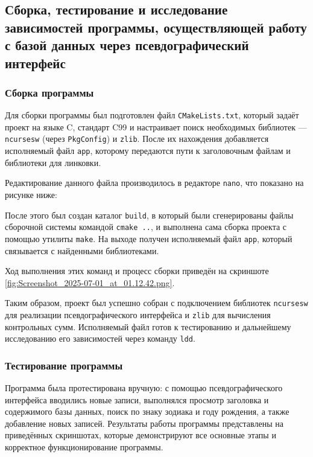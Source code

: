 \subsection{Сборка, тестирование и исследование зависимостей программы, осуществляющей работу с базой данных через псевдографический интерфейс}

\subsubsection{Сборка программы}

Для сборки программы был подготовлен файл \texttt{CMakeLists.txt}, который задаёт проект на языке C, стандарт C99 и настраивает поиск необходимых библиотек --- \texttt{ncursesw} (через \texttt{PkgConfig}) и \texttt{zlib}. После их нахождения добавляется исполняемый файл \texttt{app}, которому передаются пути к заголовочным файлам и библиотеки для линковки.

Редактирование данного файла производилось в редакторе \texttt{nano}, что показано на рисунке ниже:


После этого был создан каталог \texttt{build}, в который были сгенерированы файлы сборочной системы командой \texttt{cmake ..}, и выполнена сама сборка проекта с помощью утилиты \texttt{make}. На выходе получен исполняемый файл \texttt{app}, который связывается с найденными библиотеками.

Ход выполнения этих команд и процесс сборки приведён на скриншоте \ref{fig:Screenshot_2025-07-01_at_01.12.42.png}.


Таким образом, проект был успешно собран с подключением библиотек \texttt{ncursesw} для реализации псевдографического интерфейса и \texttt{zlib} для вычисления контрольных сумм. Исполняемый файл готов к тестированию и дальнейшему исследованию его зависимостей через команду \texttt{ldd}.

\subsubsection{Тестирование программы}

Программа была протестирована вручную: с помощью псевдографического интерфейса вводились новые записи, выполнялся просмотр заголовка и содержимого базы данных, поиск по знаку зодиака и году рождения, а также добавление новых записей. Результаты работы программы представлены на приведённых скриншотах, которые демонстрируют все основные этапы и корректное функционирование программы.

